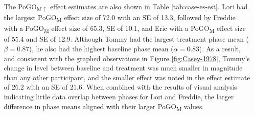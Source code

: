 \documentclass[
]{book}
\begin{document}
The \citet{Casey1978} PoGO\textsubscript{M\(\uparrow\)} effect estimates are also shown in Table \ref{tab:case-es-est}. Lori had the largest PoGO\textsubscript{M} effect size of 72.0 with an SE of 13.3, followed by Freddie with a PoGO\textsubscript{M} effect size of 65.3, SE of 10.1, and Eric with a PoGO\textsubscript{M} effect size of 55.4 and SE of 12.9. Although Tommy had the largest treatment phase mean (\(\beta = 0.87\)), he also had the highest baseline phase mean (\(\alpha = 0.83\)). As a result, and consistent with the graphed observations in Figure \ref{fig:Casey-1978}, Tommy's change in level between baseline and treatment was much smaller in magnitude than any other participant, and the smaller effect was noted in the effect estimate of 26.2 with an SE of 21.6. When combined with the results of visual analysis indicating little data overlap between phases for Lori and Freddie, the larger difference in phase means aligned with their larger PoGO\textsubscript{M} values.
\end{document}
